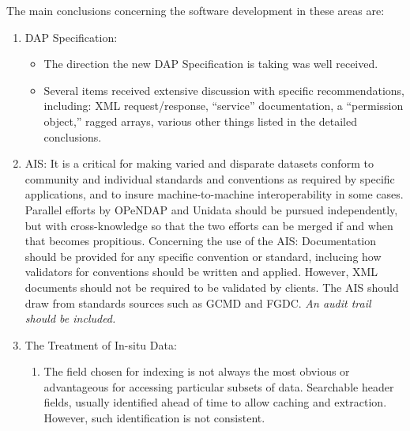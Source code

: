 The main conclusions concerning the software development in these areas
are:

\begin{enumerate}

   \item \ac{DAP} Specification: 

     \begin{itemize}
       
     \item The direction the new \ac{DAP} Specification is taking was
       well received.
       
     \item Several items received extensive discussion with specific
       recommendations, including: XML request/response, ``service''
       documentation, a ``permission object,'' ragged arrays, various
       other things listed in the detailed conclusions.

     \end{itemize}
     
   \item \ac{AIS}: It is a critical for making varied and disparate
     datasets conform to community and individual standards and
     conventions as required by specific applications, and to insure
     machine-to-machine interoperability in some cases.  Parallel
     efforts by \ac{OPeNDAP} and Unidata should be pursued
     independently, but with cross-knowledge so that the two efforts
     can be merged if and when that becomes propitious.  Concerning
     the use of the \ac{AIS}: Documentation should be provided for any
     specific convention or standard, inclucing how validators for
     conventions should be written and applied.  However, XML
     documents should not be required to be validated by clients.  The
     \ac{AIS} should draw from standards sources such as \ac{GCMD} and
     \ac{FGDC}.  \emph{An audit trail should be included.}

   \item The Treatment of In-situ Data:  

     \begin{enumerate}

     \item The field chosen for indexing is not always the most
       obvious or advantageous for accessing particular subsets of
       data.  Searchable header fields, usually identified ahead of
       time to allow caching and extraction.  However, such
       identification is not consistent.
       

\end{enumerate}
\end{enumerate}
